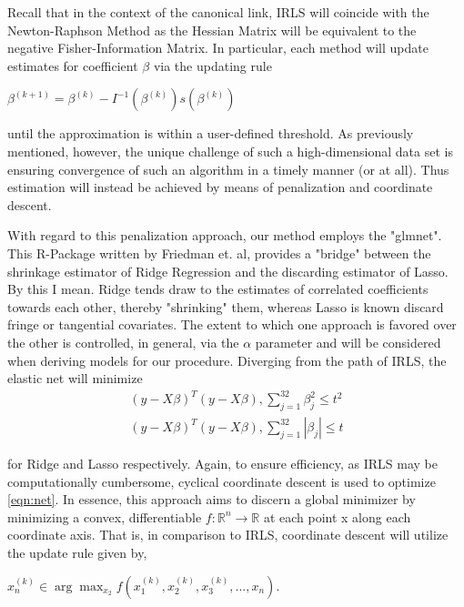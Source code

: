 \documentclass[10pt]{article}
\begin{document}
  	Recall that in the context of the canonical link, IRLS will coincide with the Newton-Raphson Method as the Hessian Matrix will be equivalent to the negative Fisher-Information Matrix.  In particular, each method will update estimates for coefficient $\beta$ via the updating rule 
	
\begin{center}
$\beta^{(k+1)}=\beta^{(k)}-I^{-1}(\beta^{(k)})s(\beta^{(k)})$
\end{center}

 until the approximation is within a user-defined threshold.  As previously mentioned, however, the unique challenge of such a high-dimensional data set is ensuring convergence of such an algorithm in a timely manner (or at all).  Thus estimation will instead be achieved by means of penalization and coordinate descent.  
 	
	With regard to this penalization approach, our method employs the "glmnet".  This R-Package written by Friedman et. al, provides a "bridge" between the shrinkage estimator of Ridge Regression and the discarding estimator of Lasso.  By this I mean. Ridge tends draw to the estimates of correlated coefficients towards each other, thereby "shrinking" them, whereas Lasso is known discard fringe or tangential covariates.  The extent to which one approach is favored over the other is controlled, in general, via the $\alpha$ parameter and will be considered when deriving models for our procedure.   Diverging from the path of IRLS, the elastic net will minimize
	\begin{equation}
	\begin{align*}
\label{eqn:net}
(y-X\beta)^T(y-X\beta), \sum_{j=1}^{32} \beta_j^2 \le t^2 \\
(y-X\beta)^T(y-X\beta), \sum_{j=1}^{32} |\beta_j| \le t
\end{align*}
\end{equation}  

 for Ridge and Lasso respectively.   Again, to ensure efficiency, as IRLS may be computationally cumbersome, cyclical coordinate descent is used to optimize \eqref{eqn:net}.   In essence, this approach aims to discern a global minimizer by minimizing a convex, differentiable $f:\mathbb{R}^n \rightarrow \mathbb{R}$ at each point x along each coordinate axis.  That is, in comparison to IRLS, coordinate descent will utilize the update rule given by, 
 
 \begin{center}
 $x_n^{(k)} \in \arg\max_{x_2} f(x_1^{(k)},x_2^{(k)},x_3^{(k)},...,x_n)$.
 \end{center}
\end{document}
